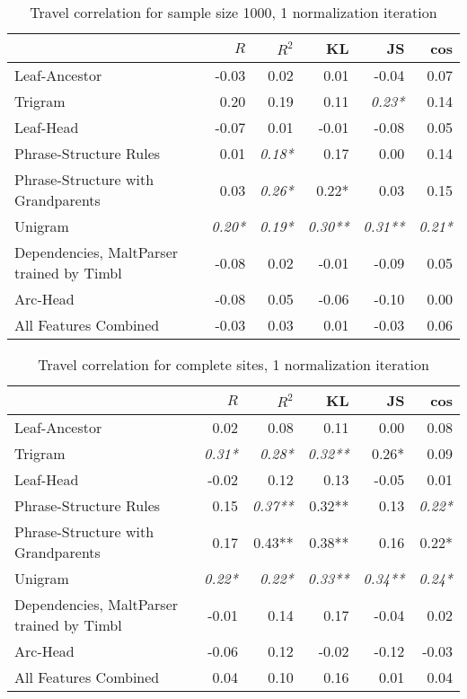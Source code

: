 \begin{table}
\begin{tabular}{l|rrrrr}
& $R$ & $R^2$ & KL & JS & cos  \\ \hline
  Leaf-Ancestor&-0.03 & 0.02 & 0.01 & -0.04 & 0.07\\
  Trigram&0.20 & 0.19 & 0.11 & \textit{0.23*} & 0.14\\
  Leaf-Head&-0.07 & 0.01 & -0.01 & -0.08 & 0.05\\
  Phrase-Structure Rules&0.01 & \textit{0.18*} & 0.17 & 0.00 & 0.14\\
  Phrase-Structure with Grandparents&0.03 & \textit{0.26*} & 0.22* & 0.03 & 0.15\\
  Unigram&\textit{0.20*} & \textit{0.19*} & \textit{0.30**} & \textit{0.31**} & \textit{0.21*}\\
  Dependencies, MaltParser trained by Timbl&-0.08 & 0.02 & -0.01 & -0.09 & 0.05\\
  Arc-Head&-0.08 & 0.05 & -0.06 & -0.10 & 0.00\\
  All Features Combined&-0.03 & 0.03 & 0.01 & -0.03 & 0.06\\
\end{tabular}
 \caption{Travel correlation for sample size 1000, 1 normalization iteration}
 \label{travel-cor-1-1000}
\end{table}

\begin{table}
\begin{tabular}{l|rrrrr}
& $R$ & $R^2$ & KL & JS & cos  \\ \hline
  Leaf-Ancestor&0.02 & 0.08 & 0.11 & 0.00 & 0.08\\
  Trigram&\textit{0.31*} & \textit{0.28*} & \textit{0.32**} & 0.26* & 0.09\\
  Leaf-Head&-0.02 & 0.12 & 0.13 & -0.05 & 0.01\\
  Phrase-Structure Rules&0.15 & \textit{0.37**} & 0.32** & 0.13 & \textit{0.22*}\\
  Phrase-Structure with Grandparents&0.17 & 0.43** & 0.38** & 0.16 & 0.22*\\
  Unigram&\textit{0.22*} & \textit{0.22*} & \textit{0.33**} & \textit{0.34**} & \textit{0.24*}\\
  Dependencies, MaltParser trained by Timbl&-0.01 & 0.14 & 0.17 & -0.04 & 0.02\\
  Arc-Head&-0.06 & 0.12 & -0.02 & -0.12 & -0.03\\
  All Features Combined&0.04 & 0.10 & 0.16 & 0.01 & 0.04\\
\end{tabular}
 \caption{Travel correlation for complete sites, 1 normalization iteration}
 \label{travel-cor-1-full}
\end{table}

